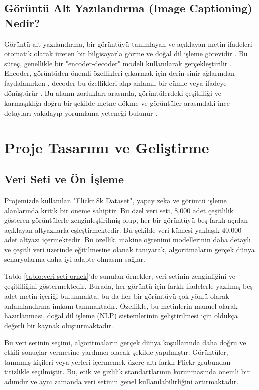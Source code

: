 \documentclass{article}
\begin{document}
\subsection{Görüntü Alt Yazılandırma (Image Captioning) Nedir?}
Görüntü alt yazılandırma, bir görüntüyü tanımlayan ve açıklayan metin ifadeleri otomatik olarak üreten bir bilgisayarla görme ve doğal dil işleme görevidir \cite{aneja2018convolutional}. Bu süreç, genellikle bir "encoder-decoder" modeli kullanılarak gerçekleştirilir \cite{vinyals2016show}. Encoder, görüntüden önemli özellikleri çıkarmak için derin sinir ağlarından faydalanırken \cite{cornia2020meshed}, decoder bu özellikleri alıp anlamlı bir cümle veya ifadeye dönüştürür \cite{pan2004automatic}. Bu alanın zorlukları arasında, görüntülerdeki çeşitliliği ve karmaşıklığı doğru bir şekilde metne dökme \cite{feng2019unsupervised} ve görüntüler arasındaki ince detayları yakalayıp yorumlama yeteneği bulunur \cite{stefanini2022show}.

\newpage
\section{Proje Tasarımı ve Geliştirme}

\subsection{Veri Seti ve Ön İşleme}

Projemizde kullanılan "Flickr 8k Dataset", yapay zeka ve görüntü işleme alanlarında kritik bir öneme sahiptir. Bu özel veri seti, 8,000 adet çeşitlilik gösteren görüntülerle zenginleştirilmiş olup, her bir görüntüyü beş farklı açıdan açıklayan altyazılarla eşleştirmektedir. Bu şekilde veri kümesi yaklaşık 40.000 adet altyazı içermektedir. Bu özellik, makine öğrenimi modellerinin daha detaylı ve çeşitli veri üzerinde eğitilmesine olanak tanıyarak, algoritmaların gerçek dünya senaryolarına daha iyi adapte olmasını sağlar.

Tablo \ref{tablo:veri-seti-ornek}'de sunulan örnekler, veri setinin zenginliğini ve çeşitliliğini göstermektedir. Burada, her görüntü için farklı ifadelerle yazılmış beş adet metin içeriği bulunmakta, bu da her bir görüntüyü çok yönlü olarak anlamlandırma imkanı tanımaktadır. Özellikle, bu metinlerin manuel olarak hazırlanması, doğal dil işleme (NLP) sistemlerinin geliştirilmesi için oldukça değerli bir kaynak oluşturmaktadır.

Bu veri setinin seçimi, algoritmaların gerçek dünya koşullarında daha doğru ve etkili sonuçlar vermesine yardımcı olacak şekilde yapılmıştır. Görüntüler, tanınmış kişileri veya yerleri içermemek üzere altı farklı Flickr grubundan titizlikle seçilmiştir. Bu, etik ve gizlilik standartlarının korunmasında önemli bir adımdır ve aynı zamanda veri setinin genel kullanılabilirliğini artırmaktadır. 
\end{document}
